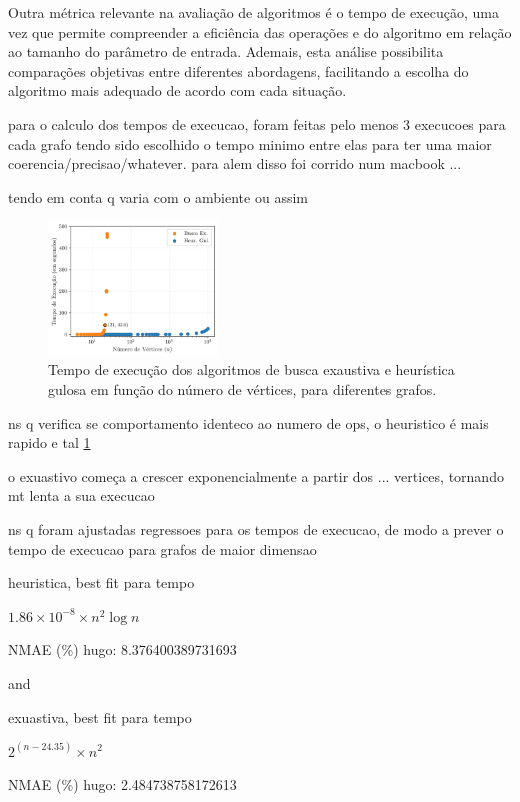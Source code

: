 \documentclass[mirror]{revdetua}
\begin{document}
Outra métrica relevante na avaliação de algoritmos é o tempo de execução, uma vez que permite compreender a eficiência das operações e do algoritmo em relação ao tamanho do parâmetro de entrada. Ademais, esta análise possibilita comparações objetivas entre diferentes abordagens, facilitando a escolha do algoritmo mais adequado de acordo com cada situação. 



para o calculo dos tempos de execucao, foram feitas pelo menos 3 execucoes para cada grafo tendo sido escolhido o tempo minimo entre elas para ter uma maior coerencia/precisao/whatever. para alem disso foi corrido num macbook ...

tendo em conta q varia com o ambiente ou assim

\begin{figure}[h]
    \centering
    \includegraphics[width=0.4\textwidth]{../assets/execTIME.png}
    \caption{Tempo de execução dos algoritmos de busca exaustiva e heurística gulosa em função do número de vértices, para diferentes grafos.}
    \label{fig:exectime}
\end{figure}

ns q verifica se comportamento identeco ao numero de ops, o heuristico é mais rapido e tal \ref{fig:exectime}

o exuastivo começa a crescer exponencialmente a partir dos ... vertices, tornando mt lenta a sua execucao

ns q foram ajustadas regressoes para os tempos de execucao, de modo a prever o tempo de execucao para grafos de maior dimensao

heuristica, best fit para tempo

$1.86 \times 10^{-8} \times n^2 \log n$

NMAE (\%) hugo: 8.376400389731693

and

exuastiva, best fit para tempo

$2^{(n - 24.35)} \times n^2$

NMAE (\%) hugo: 2.484738758172613
\end{document}
